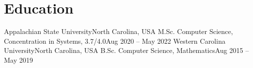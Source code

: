 \section{Education}
  \resumeSubHeadingListStart
    \resumeSubheading
      {Appalachian State University}{North Carolina, USA}
      {M.Sc. Computer Science, Concentration in Systems, 3.7/4.0}{Aug 2020 -- May 2022}
      \resumeItemListStart
      \resumeItemListEnd
    \resumeSubheading
      {Western Carolina University}{North Carolina, USA}
      {B.Sc. Computer Science, Mathematics}{Aug 2015 -- May 2019}
      \resumeItemListStart
      \resumeItemListEnd
  \resumeSubHeadingListEnd
